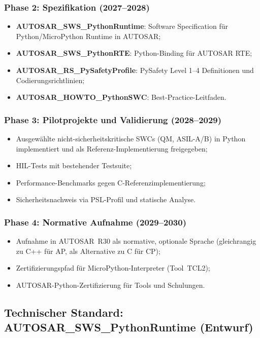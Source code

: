 ﻿\documentclass[12pt,a4paper,twoside]{article}
\begin{document}
\subsubsection{Phase 2: Spezifikation (2027--2028)}
\begin{itemize}
  \item \textbf{AUTOSAR\_SWS\_PythonRuntime}: Software Specification für
        Python/MicroPython Runtime in AUTOSAR;
  \item \textbf{AUTOSAR\_SWS\_PythonRTE}: Python-Binding für AUTOSAR RTE;
  \item \textbf{AUTOSAR\_RS\_PySafetyProfile}: PySafety Level 1--4 Definitionen
        und Codierungsrichtlinien;
  \item \textbf{AUTOSAR\_HOWTO\_PythonSWC}: Best-Practice-Leitfaden.
\end{itemize}

\subsubsection{Phase 3: Pilotprojekte und Validierung (2028--2029)}
\begin{itemize}
  \item Ausgewählte nicht-sicherheitskritische SWCs (QM, ASIL-A/B)
        in Python implementiert und als Referenz-Implementierung freigegeben;
  \item HIL-Tests mit bestehender Testsuite;
  \item Performance-Benchmarks gegen C-Referenzimplementierung;
  \item Sicherheitsnachweis via PSL-Profil und statische Analyse.
\end{itemize}

\subsubsection{Phase 4: Normative Aufnahme (2029--2030)}
\begin{itemize}
  \item Aufnahme in AUTOSAR~R30 als normative, optionale Sprache
        (gleichrangig zu C++ für AP, als Alternative zu C für CP);
  \item Zertifizierungspfad für MicroPython-Interpreter (Tool~TCL2);
  \item AUTOSAR-Python-Zertifizierung für Tools und Schulungen.
\end{itemize}

\subsection{Technischer Standard: AUTOSAR\_SWS\_PythonRuntime (Entwurf)}
\label{subsec:sws_draft}
\end{document}
